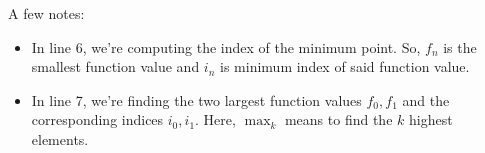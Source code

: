 \documentclass[letterpaper]{article}
\begin{document}
A few notes: 
\begin{itemize}
    \item In line 6, we're computing the index of the minimum point. So, $f_n$ is the smallest function value and $i_n$ is minimum index of said function value. %
    \item In line 7, we're finding the two largest function values $f_0, f_1$ and the corresponding indices $i_0, i_1$. Here, $\max_{k}$ means to find the $k$ highest elements. %
\end{itemize}
\end{document}
